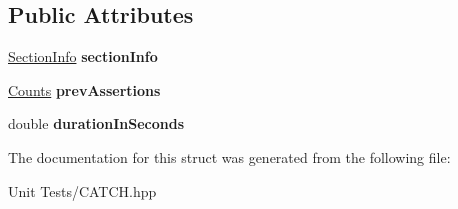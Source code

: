 \subsection*{Public Attributes}
\begin{DoxyCompactItemize}
\item 
\hyperlink{structCatch_1_1SectionInfo}{Section\+Info} {\bfseries section\+Info}\hypertarget{structCatch_1_1SectionEndInfo_a2d44793392cb83735d086d726822abe9}{}\label{structCatch_1_1SectionEndInfo_a2d44793392cb83735d086d726822abe9}

\item 
\hyperlink{structCatch_1_1Counts}{Counts} {\bfseries prev\+Assertions}\hypertarget{structCatch_1_1SectionEndInfo_ae70b154cbc05b5dd2901d97f89303d8c}{}\label{structCatch_1_1SectionEndInfo_ae70b154cbc05b5dd2901d97f89303d8c}

\item 
double {\bfseries duration\+In\+Seconds}\hypertarget{structCatch_1_1SectionEndInfo_a7c262f2dab9cff166b8eca620c47eea5}{}\label{structCatch_1_1SectionEndInfo_a7c262f2dab9cff166b8eca620c47eea5}

\end{DoxyCompactItemize}


The documentation for this struct was generated from the following file\+:\begin{DoxyCompactItemize}
\item 
Unit Tests/C\+A\+T\+C\+H.\+hpp\end{DoxyCompactItemize}

